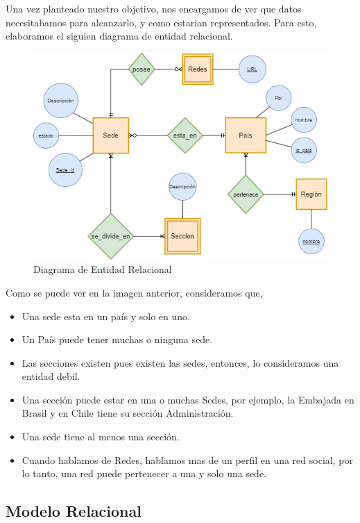 \documentclass[10pt,a4paper]{article}
\begin{document}
Una vez planteado nuestro objetivo, nos encargamos de ver que datos necesitabamos para alcanzarlo, y como estarian representados. Para esto, elaboramos el siguien diagrama de entidad
relacional.  \vspace{0.2cm}

\begin{figure}[ht]
	\centering
	\includegraphics[width=1\textwidth]{DiagramaFinal.png}
	\caption{Diagrama de Entidad Relacional}
	\label{fig:ejemplo}
\end{figure} \vspace{0.1cm}

Como se puede ver en la imagen anterior, consideramos que,

\begin{itemize}
	\item Una sede esta en un país y solo en uno.
	\item Un País puede tener muchas o ninguna sede.
	\item Las secciones existen pues existen las sedes, entonces, lo consideramos una entidad debil.
	\item Una sección puede estar en una o muchas Sedes, por ejemplo, la Embajada en Brasil y en Chile tiene su sección Administración.
	\item Una sede tiene al menos una sección.
	\item Cuando hablamos de Redes, hablamos mas de un perfil en una red social, por lo tanto, una red puede pertenecer a una y solo una sede.
\end{itemize}


\subsection{Modelo Relacional} \vspace{0.2cm}
\end{document}
